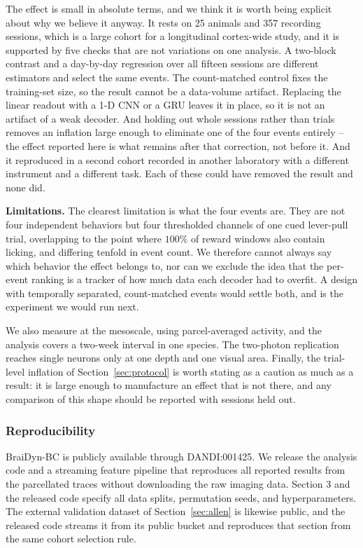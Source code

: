 \documentclass[mlabstract,onecolumn]{jmlr}
\begin{document}
The effect is small in absolute terms, and we think it is worth being explicit about why we believe
it anyway. It rests on 25 animals and 357 recording sessions, which is a large cohort for a
longitudinal cortex-wide study, and it is supported by five checks that are not variations on one
analysis. A two-block contrast and a day-by-day regression over all fifteen sessions are different
estimators and select the same events. The count-matched control fixes the training-set size, so the
result cannot be a data-volume artifact. Replacing the linear readout with a 1-D CNN or a GRU leaves
it in place, so it is not an artifact of a weak decoder. And holding out whole sessions rather than
trials removes an inflation large enough to eliminate one of the four events entirely -- the effect
reported here is what remains after that correction, not before it. And it reproduced in a second
cohort recorded in another laboratory with a different instrument and a different task. Each of
these could have removed the result and none did.

\textbf{Limitations.} The clearest limitation is what the four events are. They are not four
independent behaviors but four thresholded channels of one cued lever-pull trial, overlapping to the
point where $100\%$ of reward windows also contain licking, and differing tenfold in event count. We
therefore cannot always say which behavior the effect belongs to, nor can we exclude the idea that
the per-event ranking is a tracker of how much data each decoder had to overfit. A design with
temporally separated, count-matched events would settle both, and is the experiment we would run
next.

We also measure at the mesoscale, using parcel-averaged activity, and the analysis covers a two-week
interval in one species. The two-photon replication reaches single neurons only at one depth and one
visual area. Finally, the trial-level inflation of
Section~\ref{sec:protocol} is worth stating as a caution as much as a result: it is large enough to
manufacture an effect that is not there, and any comparison of this shape should be reported with
sessions held out.

\subsubsection*{Reproducibility}
BraiDyn-BC is publicly available through DANDI:001425. We release the analysis code and a streaming
feature pipeline that reproduces all reported results from the parcellated traces without downloading
the raw imaging data. Section 3 and the released code specify all data splits, permutation seeds, and
hyperparameters. The external validation dataset of Section~\ref{sec:allen} is likewise public, and
the released code streams it from its public bucket and reproduces that section from the same cohort
selection rule.


\end{document}
